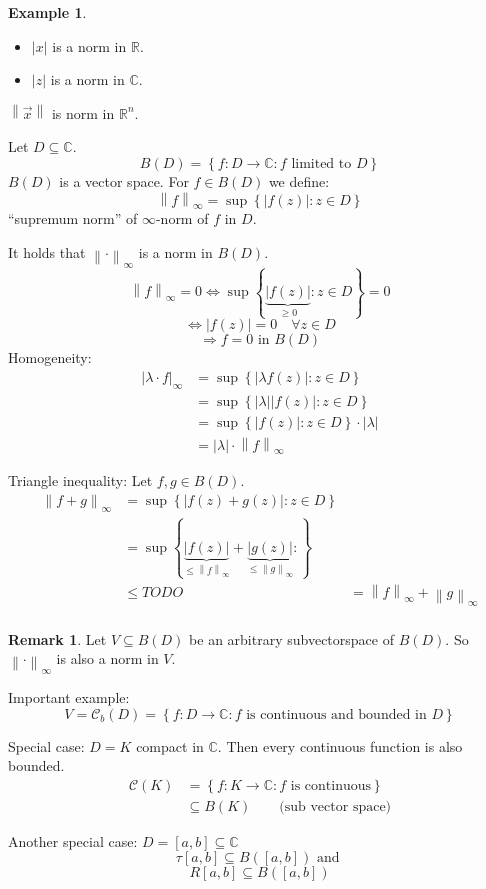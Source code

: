 \documentclass[a4paper,landscape,twocolumn]{article}
\theoremstyle{definition}
\newtheorem{rem}{Remark}
\newtheorem{ex}{Example}
\newcommand\set[1]{\left\{#1\right\}}
\newcommand\abs[1]{\left|#1\right|}
\newcommand\norm[1]{\left\|#1\right\|}
\begin{document}
\begin{ex}
  \begin{itemize}
    \item $\abs{x}$ is a norm in $\mathbb R$.
    \item $\abs{z}$ is a norm in $\mathbb C$.
  \end{itemize}
  $\norm{\vec{x}}$ is norm in $\mathbb R^n$.

  Let $D \subseteq \mathbb C$.
  \[ B(D) = \set{f: D \to \mathbb C: f \text{ limited to } D} \]
  $B(D)$ is a vector space. For $f \in B(D)$ we define:
  \[ \norm{f}_{\infty} = \sup\set{\abs{f(z)}: z \in D} \]
  \enquote{supremum norm} of $\infty$-norm of $f$ in $D$.

  It holds that $\norm{\cdot}_{\infty}$ is a norm in $B(D)$.
  \[ \norm{f}_\infty = 0 \Leftrightarrow \sup\set{\underbrace{\abs{f(z)}}_{\geq 0}: z \in D} = 0 \]
  \[ \Leftrightarrow \abs{f(z)} = 0 \quad \forall z \in D \]
  \[ \Rightarrow f = 0 \text{ in } B(D) \]
  Homogeneity:
  \begin{align*}
    \abs{\lambda \cdot f}_\infty
      &= \sup\set{\abs{\lambda f(z)}: z \in D} \\
      &= \sup\set{\abs{\lambda} \abs{f(z)}: z \in D} \\
      &= \sup\set{\abs{f(z)}: z \in D} \cdot \abs{\lambda} \\
      &= \abs{\lambda} \cdot \norm{f}_\infty
  \end{align*}

  Triangle inequality:
  Let $f,g \in B(D)$.
  \begin{align*}
    \norm{f+g}_\infty
      &= \sup\set{\abs{f(z) + g(z)}: z \in D} \\
      &= \sup\set{\underbrace{\abs{f(z)}}_{\leq \norm{f}_\infty} + \underbrace{\abs{g(z)}}_{\leq \norm{g}_\infty}:} \\
      &\leq TODO
      &= \norm{f}_\infty + \norm{g}_\infty \\
  \end{align*}
\end{ex}

\begin{rem}
  Let $V \subseteq B(D)$ be an arbitrary subvectorspace of $B(D)$.
  So $\norm{\cdot}_\infty$ is also a norm in $V$.

  Important example:
  \[ V = \mathcal C_b(D) = \set{f: D \to \mathbb C: f \text{ is continuous and bounded in } D} \]

  Special case: $D = K$ compact in $\mathbb C$.
  Then every continuous function is also bounded.
  \begin{align*}
    \mathcal C(K) &= \set{f: K \to \mathbb C: f \text{ is continuous}} \\
      &\subseteq B(K) \qquad \text{(sub vector space)}
  \end{align*}

  Another special case: $D = [a,b] \subseteq \mathbb C$
  \[ \tau[a,b] \subseteq B([a,b]) \text{ and } \]
  \[ R[a,b] \subseteq B([a,b]) \]
\end{rem}
\end{document}
